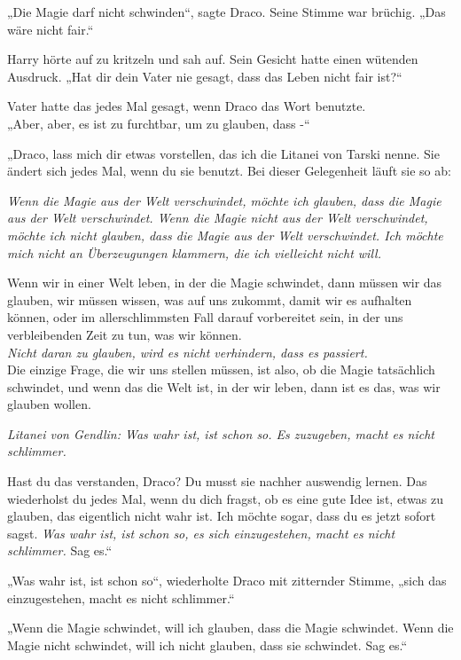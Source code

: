 {„Die Magie darf nicht schwinden“, sagte Draco. Seine Stimme war brüchig. „Das wäre nicht fair.“

Harry hörte auf zu kritzeln und sah auf. Sein Gesicht hatte einen wütenden Ausdruck. „Hat dir dein Vater nie gesagt, dass das Leben nicht fair ist?“

Vater hatte das jedes Mal gesagt, wenn Draco das Wort benutzte.\\ „Aber, aber, es ist zu furchtbar, um zu glauben, dass -“

„Draco, lass mich dir etwas vorstellen, das ich die Litanei von Tarski nenne. Sie ändert sich jedes Mal, wenn du sie benutzt. Bei dieser Gelegenheit läuft sie so ab:

\emph{Wenn die Magie aus der Welt verschwindet, möchte ich glauben, dass die Magie aus der Welt verschwindet. Wenn die Magie nicht aus der Welt verschwindet, möchte ich nicht glauben, dass die Magie aus der Welt verschwindet. Ich möchte mich nicht an Überzeugungen klammern, die ich vielleicht nicht will.}

Wenn wir in einer Welt leben, in der die Magie schwindet, dann müssen wir das glauben, wir müssen wissen, was auf uns zukommt, damit wir es aufhalten können, oder im allerschlimmsten Fall darauf vorbereitet sein, in der uns verbleibenden Zeit zu tun, was wir können.\\ \emph{Nicht daran zu glauben, wird es nicht verhindern, dass es passiert.}\\ Die einzige Frage, die wir uns stellen müssen, ist also, ob die Magie tatsächlich schwindet, und wenn das die Welt ist, in der wir leben, dann ist es das, was wir glauben wollen.

\emph{Litanei von Gendlin: Was wahr ist, ist schon so. Es zuzugeben, macht es nicht schlimmer.}

Hast du das verstanden, Draco? Du musst sie nachher auswendig lernen. Das wiederholst du jedes Mal, wenn du dich fragst, ob es eine gute Idee ist, etwas zu glauben, das eigentlich nicht wahr ist. Ich möchte sogar, dass du es jetzt sofort sagst. \emph{Was wahr ist, ist schon so, es sich einzugestehen, macht es nicht schlimmer.} Sag es.“

„Was wahr ist, ist schon so“, wiederholte Draco mit zitternder Stimme, „sich das einzugestehen, macht es nicht schlimmer.“

„Wenn die Magie schwindet, will ich glauben, dass die Magie schwindet. Wenn die Magie nicht schwindet, will ich nicht glauben, dass sie schwindet. Sag es.“

}
